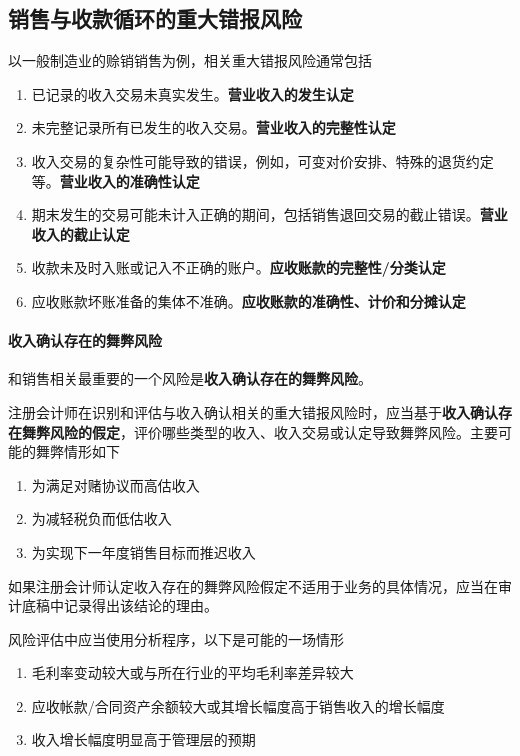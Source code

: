 \documentclass[UTF8,12pt]{ctexart}
\numberwithin{equation}{section} %
\numberwithin{figure}{section}
\numberwithin{table}{section}
\begin{document}
	\subsection{销售与收款循环的重大错报风险}
	以一般制造业的赊销销售为例，相关重大错报风险通常包括
	\begin{enumerate}
		\item 已记录的收入交易未真实发生。\textbf{营业收入的发生认定}
		
		\item 未完整记录所有已发生的收入交易。\textbf{营业收入的完整性认定}
		
		\item 收入交易的复杂性可能导致的错误，例如，可变对价安排、特殊的退货约定等。\textbf{营业收入的准确性认定}
		
		\item 期末发生的交易可能未计入正确的期间，包括销售退回交易的截止错误。\textbf{营业收入的截止认定}
		
		\item 收款未及时入账或记入不正确的账户。\textbf{应收账款的完整性/分类认定}
		
		\item 应收账款坏账准备的集体不准确。\textbf{应收账款的准确性、计价和分摊认定}
	\end{enumerate}
	
	\paragraph{收入确认存在的舞弊风险}和销售相关最重要的一个风险是\textbf{收入确认存在的舞弊风险}。
	
	注册会计师在识别和评估与收入确认相关的重大错报风险时，应当基于\textbf{收入确认存在舞弊风险的假定}，评价哪些类型的收入、收入交易或认定导致舞弊风险。主要可能的舞弊情形如下
	\begin{enumerate}
		\item 为满足对赌协议而高估收入
		
		\item 为减轻税负而低估收入
		
		\item 为实现下一年度销售目标而推迟收入
	\end{enumerate}
	
	如果注册会计师认定收入存在的舞弊风险假定不适用于业务的具体情况，应当在审计底稿中记录得出该结论的理由。
	
	风险评估中应当使用分析程序，以下是可能的一场情形
	\begin{enumerate}
		\item 毛利率变动较大或与所在行业的平均毛利率差异较大
		
		\item 应收帐款/合同资产余额较大或其增长幅度高于销售收入的增长幅度
		
		\item 收入增长幅度明显高于管理层的预期
	\end{enumerate}
	
\end{document}
